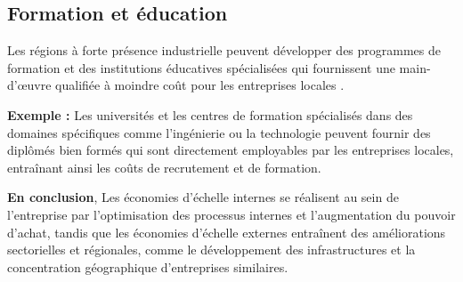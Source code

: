 \subsection{Formation et éducation}
Les régions à forte présence industrielle peuvent développer des programmes de
formation et des institutions éducatives spécialisées qui fournissent une
main-d'œuvre qualifiée à moindre coût pour les entreprises locales .
\par
\textbf{Exemple :} Les universités et les centres de formation spécialisés dans des
domaines spécifiques comme l'ingénierie ou la technologie peuvent fournir des
diplômés bien formés qui sont directement employables par les entreprises
locales, entraînant ainsi les coûts de recrutement et de formation.

\par
\par
\textbf{ En conclusion}, Les économies d'échelle internes se réalisent au sein de
l'entreprise par l'optimisation des processus internes et l'augmentation du
pouvoir d'achat, tandis que les économies d'échelle externes entraînent des
améliorations sectorielles et régionales, comme le développement des
infrastructures et la concentration géographique d'entreprises similaires.